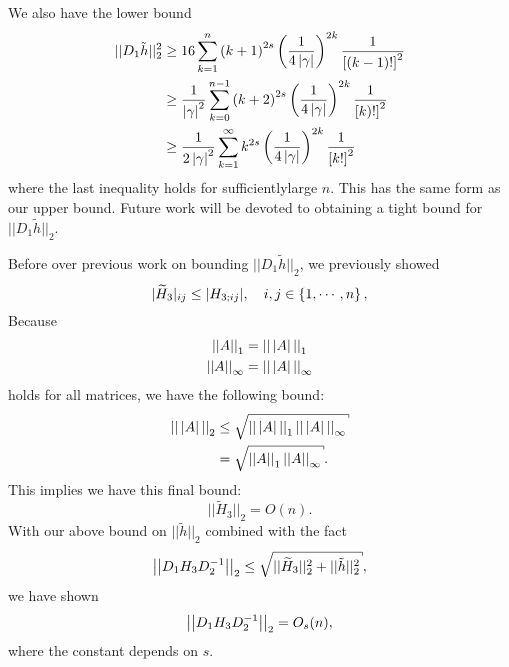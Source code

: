 We also have the lower bound
%
\begin{align}
    ||D_{1}\tilde{h}||_{2}^{2}
        &\ge 16 \sum_{k=1}^{n} \left( k+1 \right)^{2s}
        \left( \frac{1}{4\left| \gamma \right|} \right)^{2k}\frac{1}{\left[ (k-1)! \right]^{2}}
        \nonumber\\
        &\ge \frac{1}{\left| \gamma \right|^{2}} \sum_{k=0}^{n-1} \left( k+2 \right)^{2s}
        \left( \frac{1}{4\left| \gamma \right|} \right)^{2k}\frac{1}{\left[ k)! \right]^{2}}
        \nonumber\\
        &\ge \frac{1}{2\left| \gamma \right|^{2}} \sum_{k=1}^{\infty} k^{2s}
        \left( \frac{1}{4\left| \gamma \right|} \right)^{2k}\frac{1}{\left[ k! \right]^{2}}
\end{align}
%
where the last inequality holds for sufficientlylarge $n$.
This has the same form as our upper bound.
Future work will be devoted to obtaining a tight bound
for $||D_{1}\tilde{h}||_{2}$.

Before over previous work on bounding $||D_{1}\tilde{h}||_{2}$,
we previously showed
%
\begin{equation}
    |\widetilde{H}_{3}|_{ij} \le |H_{3;ij}|, \quad i,j\in\left\{ 1,\cdots,n \right\},
\end{equation}
%
Because
%
\begin{align}
    \left| \left| A \right| \right|_{1} &= \left| \left| \,\left| A \right|\, \right| \right|_{1} \nonumber\\
    \left| \left| A \right| \right|_{\infty} &= \left| \left| \,\left| A \right|\, \right| \right|_{\infty}
\end{align}
%
holds for all matrices, we have the following bound:
%
\begin{align}
    \norm{\,\abs{A}\,}_{2}
        &\le \sqrt{\norm{\,\abs{A}\,}_{1}\norm{\,\abs{A}\,}_{\infty}}
            \nonumber\\
    &=\sqrt{\norm{A}_{1}\norm{A}_{\infty}}.
\end{align}
%
This implies we have this final bound:
%
\begin{equation}
    ||\widetilde{H}_{3}||_{2} = O(n).
\end{equation}
%
With our above bound on $||\tilde{h}||_{2}$ combined with the fact
%
\begin{equation}
    \norm{D_{1}H_{3}D_{2}^{-1}}_{2} \le \sqrt{||\widetilde{H}_{3}||_{2}^{2}
        + ||\tilde{h}||_{2}^{2}},
\end{equation}
%
we have shown
%
\begin{equation}
    \left| \left| D_{1}H_{3}D_{2}^{-1} \right| \right|_{2} = O_{s}(n),
\end{equation}
%
where the constant depends on $s$.

